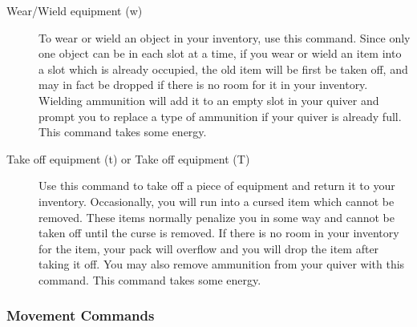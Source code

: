 \begin{description}
\item[Wear/Wield equipment (w)] To wear or wield an object in your
    inventory, use this command. Since only one object can be in each
    slot at a time, if you wear or wield an item into a slot which is
    already occupied, the old item will be first be taken off, and may
    in fact be dropped if there is no room for it in your inventory.
    Wielding ammunition will add it to an empty slot in your quiver and
    prompt you to replace a type of ammunition if your quiver is already
    full.  This command takes some energy.

\item[Take off equipment (t) or Take off equipment (T)] Use this command
    to take off a piece of equipment and return it to your inventory.
    Occasionally, you will run into a cursed item which cannot be
    removed.  These items normally penalize you in some way and cannot
    be taken off until the curse is removed. If there is no room in your
    inventory for the item, your pack will overflow and you will drop
    the item after taking it off. You may also remove ammunition from
    your quiver with this command. This command takes some energy.
    \end{description}

\subsubsection{Movement Commands} 
